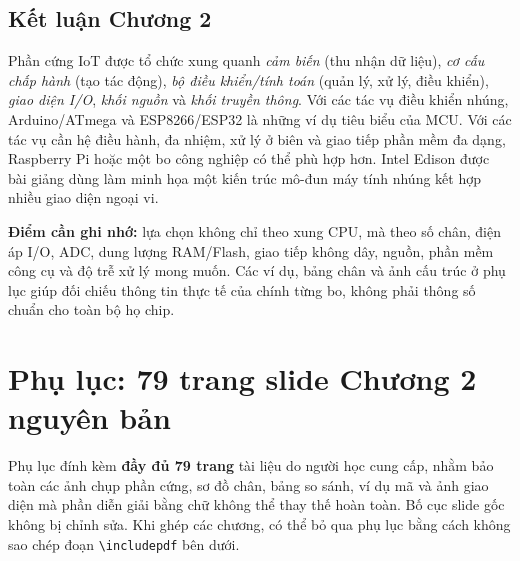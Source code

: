 \section{Kết luận Chương 2}
Phần cứng IoT được tổ chức xung quanh \emph{cảm biến} (thu nhận dữ liệu), \emph{cơ cấu chấp hành} (tạo tác động), \emph{bộ điều khiển/tính toán} (quản lý, xử lý, điều khiển), \emph{giao diện I/O}, \emph{khối nguồn} và \emph{khối truyền thông}. Với các tác vụ điều khiển nhúng, Arduino/ATmega và ESP8266/ESP32 là những ví dụ tiêu biểu của MCU. Với các tác vụ cần hệ điều hành, đa nhiệm, xử lý ở biên và giao tiếp phần mềm đa dạng, Raspberry Pi hoặc một bo công nghiệp có thể phù hợp hơn. Intel Edison được bài giảng dùng làm minh họa một kiến trúc mô-đun máy tính nhúng kết hợp nhiều giao diện ngoại vi.

\textbf{Điểm cần ghi nhớ:} lựa chọn không chỉ theo xung CPU, mà theo số chân, điện áp I/O, ADC, dung lượng RAM/Flash, giao tiếp không dây, nguồn, phần mềm công cụ và độ trễ xử lý mong muốn. Các ví dụ, bảng chân và ảnh cấu trúc ở phụ lục giúp đối chiếu thông tin thực tế của chính từng bo, không phải thông số chuẩn cho toàn bộ họ chip.
\ifdefined\iotstandalone
\clearpage
\appendix
\chapter{Phụ lục: 79 trang slide Chương 2 nguyên bản}
Phụ lục đính kèm \textbf{đầy đủ 79 trang} tài liệu do người học cung cấp, nhằm bảo toàn các ảnh chụp phần cứng, sơ đồ chân, bảng so sánh, ví dụ mã và ảnh giao diện mà phần diễn giải bằng chữ không thể thay thế hoàn toàn. Bố cục slide gốc không bị chỉnh sửa. Khi ghép các chương, có thể bỏ qua phụ lục bằng cách không sao chép đoạn \texttt{\textbackslash includepdf} bên dưới.
\fi %
